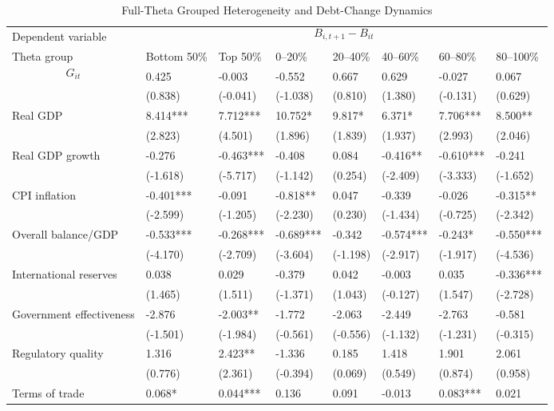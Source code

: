 \begin{table}[H]\centering
\begin{threeparttable}
\caption{Full-Theta Grouped Heterogeneity and Debt-Change Dynamics}
\label{tab:theta_group_heterogeneity_debt}
\scriptsize
\begin{tabularx}{\textwidth}{lYYYYYYY}
\toprule
Dependent variable &  \\
\cmidrule(lr){2-8}
Theta group & Bottom 50\% & Top 50\% & 0--20\% & 20--40\% & 40--60\% & 60--80\% & 80--100\% \\
\midrule
$$G_{it}$$ & 0.425 & -0.003 & -0.552 & 0.667 & 0.629 & -0.027 & 0.067 \\
  & (0.838) & (-0.041) & (-1.038) & (0.810) & (1.380) & (-0.131) & (0.629) \\
Real GDP & 8.414*** & 7.712*** & 10.752* & 9.817* & 6.371* & 7.706*** & 8.500** \\
  & (2.823) & (4.501) & (1.896) & (1.839) & (1.937) & (2.993) & (2.046) \\
Real GDP growth & -0.276 & -0.463*** & -0.408 & 0.084 & -0.416** & -0.610*** & -0.241 \\
  & (-1.618) & (-5.717) & (-1.142) & (0.254) & (-2.409) & (-3.333) & (-1.652) \\
CPI inflation & -0.401*** & -0.091 & -0.818** & 0.047 & -0.339 & -0.026 & -0.315** \\
  & (-2.599) & (-1.205) & (-2.230) & (0.230) & (-1.434) & (-0.725) & (-2.342) \\
Overall balance/GDP & -0.533*** & -0.268*** & -0.689*** & -0.342 & -0.574*** & -0.243* & -0.550*** \\
  & (-4.170) & (-2.709) & (-3.604) & (-1.198) & (-2.917) & (-1.917) & (-4.536) \\
International reserves & 0.038 & 0.029 & -0.379 & 0.042 & -0.003 & 0.035 & -0.336*** \\
  & (1.465) & (1.511) & (-1.371) & (1.043) & (-0.127) & (1.547) & (-2.728) \\
Government effectiveness & -2.876 & -2.003** & -1.772 & -2.063 & -2.449 & -2.763 & -0.581 \\
  & (-1.501) & (-1.984) & (-0.561) & (-0.556) & (-1.132) & (-1.231) & (-0.315) \\
Regulatory quality & 1.316 & 2.423** & -1.336 & 0.185 & 1.418 & 1.901 & 2.061 \\
  & (0.776) & (2.361) & (-0.394) & (0.069) & (0.549) & (0.874) & (0.958) \\
Terms of trade & 0.068* & 0.044*** & 0.136 & 0.091 & -0.013 & 0.083*** & 0.021 \\

\end{tabularx}
\end{threeparttable}
\end{table}
